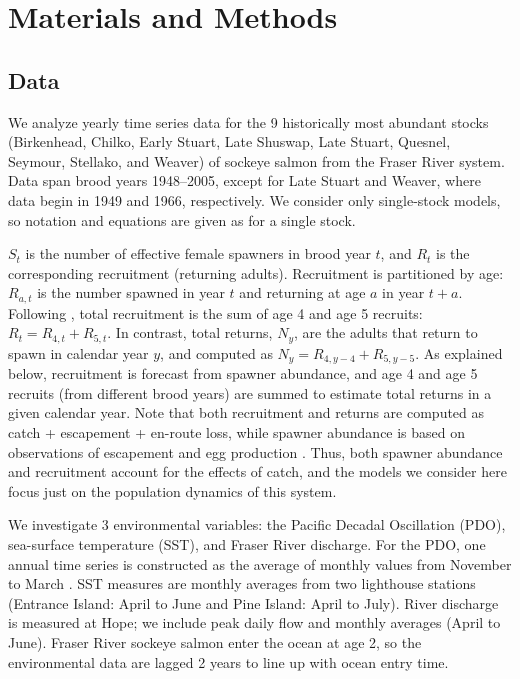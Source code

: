 \section{Materials and Methods}
\label{salmon_materials}

\subsection{Data}

We analyze yearly time series data for the 9 historically most abundant stocks (Birkenhead, Chilko, Early Stuart, Late Shuswap, Late Stuart, Quesnel, Seymour, Stellako, and Weaver) of sockeye salmon from the Fraser River system. Data span brood years 1948--2005, except for Late Stuart and Weaver, where data begin in 1949 and 1966, respectively. We consider only single-stock models, so notation and equations are given as for a single stock.

$S_t$ is the number of effective female spawners in brood year $t$, and $R_t$ is the corresponding recruitment (returning adults). Recruitment is partitioned by age: $R_{a, t}$  is the number spawned in year $t$ and returning at age $a$ in year $t + a$. Following \cite{Grant_2010}, total recruitment is the sum of age 4 and age 5 recruits: $R_t = R_{4, t} + R_{5, t}$. In contrast, total returns, $N_y$, are the adults that return to spawn in calendar year $y$, and computed as $N_y = R_{4, y-4} + R_{5, y-5}$. As explained below, recruitment is forecast from spawner abundance, and age 4 and age 5 recruits (from different brood years) are summed to estimate total returns in a given calendar year. Note that both recruitment and returns are computed as catch + escapement + en-route loss, while spawner abundance is based on observations of escapement and egg production \cite{Grant_2011}. Thus, both spawner abundance and recruitment account for the effects of catch, and the models we consider here focus just on the population dynamics of this system.

We investigate 3 environmental variables: the Pacific Decadal Oscillation (PDO), sea-surface temperature (SST), and Fraser River discharge. For the PDO, one annual time series is constructed as the average of monthly values from November to March \cite{Mantua_1997}. SST measures are monthly averages from two lighthouse stations (Entrance Island: April to June and Pine Island: April to July). River discharge is measured at Hope; we include peak daily flow and monthly averages (April to June). Fraser River sockeye salmon enter the ocean at age 2, so the environmental data are lagged 2 years to line up with ocean entry time.

